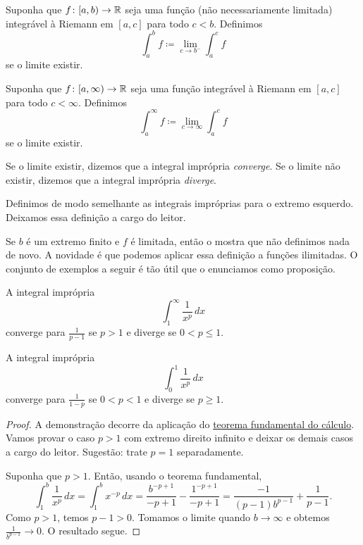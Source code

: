 \begin{defn}
Suponha que $f \colon [a,b) \to {\mathbb{R}}$ seja uma função (não necessariamente
limitada) integrável à Riemann em $[a,c]$ para todo $c < b$. Definimos
\begin{equation*}
\int_a^b f \coloneqq \lim_{c \to b^-} \int_a^{c} f
\end{equation*}
se o limite existir.

Suponha que $f \colon [a,\infty) \to {\mathbb{R}}$ seja uma função integrável à
Riemann em $[a,c]$ para todo $c < \infty$.
Definimos
\begin{equation*}
\int_a^\infty f \coloneqq \lim_{c \to \infty} \int_a^c f
\end{equation*}
se o limite existir.

Se o limite existir, dizemos que a integral imprópria
\emph{converge}.
Se o limite não existir, dizemos que a integral imprópria
\emph{diverge}.

Definimos de modo semelhante as integrais impróprias para o extremo esquerdo.
Deixamos essa definição a cargo do leitor.
\end{defn}

Se $b$ é um extremo finito e $f$ é limitada, então o
 mostra que não definimos nada de novo.
A novidade é que podemos aplicar essa definição a funções ilimitadas.
O conjunto de exemplos a seguir é tão útil que o enunciamos como proposição.

\begin{prop}%
\label{impropriemann:ptest}
A integral imprópria
\begin{equation*}
\int_1^\infty \frac{1}{x^p} \,dx
\end{equation*}
converge para $\frac{1}{p-1}$ se $p > 1$ e diverge se $0 < p \leq 1$.

A integral imprópria
\begin{equation*}
\int_0^1 \frac{1}{x^p} \,dx
\end{equation*}
converge para $\frac{1}{1-p}$ se $0 < p < 1$ e diverge se $p \geq 1$.
\end{prop}

\begin{proof}
 A demonstração decorre da aplicação do
\hyperref[thm:FTCv1]{teorema fundamental do cálculo}.
Vamos provar o caso $p > 1$ com extremo direito infinito e deixar os demais
casos a cargo do leitor. Sugestão: trate $p=1$
separadamente.

Suponha que $p > 1$. Então, usando o teorema fundamental,
\begin{equation*}
\int_1^b \frac{1}{x^p} \,dx
=
\int_1^b x^{-p} \,dx
=
\frac{b^{-p+1}}{-p+1}
-
\frac{1^{-p+1}}{-p+1}
=
\frac{-1}{(p-1)b^{p-1}}
+
\frac{1}{p-1} .
\end{equation*}
Como $p > 1$, temos $p-1 > 0$. Tomamos o limite quando $b \to \infty$
e obtemos $\frac{1}{b^{p-1}} \to 0$. O resultado segue.
\end{proof}

